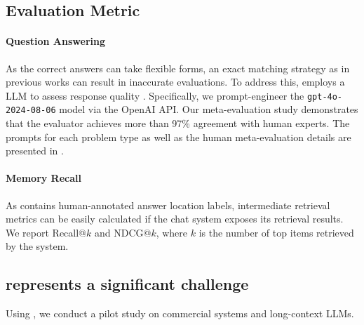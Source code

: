 \subsection{Evaluation Metric}

\paragraph{Question Answering} As the correct answers can take flexible forms, an exact matching strategy as in previous works can result in inaccurate evaluations. To address this, \BENCHMARK{} employs a LLM to assess response quality \citep{liu-etal-2023-g}. Specifically, we prompt-engineer  the \texttt{gpt-4o-2024-08-06} model via the OpenAI API. Our meta-evaluation study demonstrates that the evaluator achieves more than 97\% agreement with human experts. The prompts for each problem type as well as the human meta-evaluation details are presented in .


\paragraph{Memory Recall} As \BENCHMARK{} contains human-annotated answer location labels, intermediate retrieval metrics can be easily calculated if the chat system exposes its retrieval results. We report Recall@$k$ and NDCG@$k$, where $k$ is the number of top items retrieved by the system.


\subsection{\BENCHMARK{} represents a significant challenge}
\label{section-benchmark-challenging}

Using \BENCHMARK, we conduct a pilot study on commercial systems and long-context LLMs.

